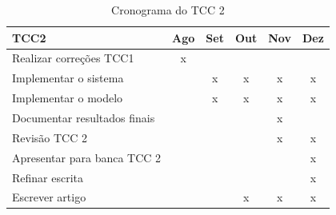 \begin{table}[h]
	\centering
	\begin{tabular}{@{}lccccc@{}}
	\toprule
	TCC2                         & \multicolumn{1}{l}{Ago} & \multicolumn{1}{l}{Set} & \multicolumn{1}{l}{Out} & \multicolumn{1}{l}{Nov} & \multicolumn{1}{l}{Dez} \\ \midrule
	Realizar correções TCC1      & x                       &                         &                         &                         &                         \\
	Implementar o sistema        &                         & x                       & x                       & x                       & x                       \\
	Implementar o modelo         &                         & x                       & x                       & x                       & x                       \\
	Documentar resultados finais &                         &                         &                         & x                       &                         \\
	Revisão TCC 2                &                         &                         &                         & x                       & x                       \\
	Apresentar para banca TCC 2  &                         &                         &                         &                         & x                       \\
	Refinar escrita              &                         &                         &                         &                         & x                       \\
	Escrever artigo              &                         &                         & x                       & x                       & x                       \\ \bottomrule
	\end{tabular}
	\caption{Cronograma do TCC 2}
	\label{table:CronogramaTCC2}
	\end{table}